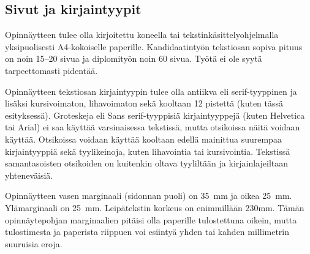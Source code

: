 \documentclass[english,12pt,a4paper,pdftex,elec,utf8]{aaltothesis}
\begin{document}
\subsection*{Sivut ja kirjaintyypit}

Opinn\"aytteen tulee olla kirjoitettu koneella tai
tekstink\"asittelyohjelmalla yksipuolisesti A4-kokoiselle paperille.
Kandidaatinty\"on tekstiosan sopiva pituus on noin 15--20 sivua ja
diplomity\"on noin 60 sivua. Ty\"ot\"a ei ole syyt\"a tarpeettomasti pident\"a\"a.

Opinn\"aytteen tekstiosan kirjaintyypin tulee olla antiikva eli
serif\--tyyp\-pi\-nen ja lis\"aksi kursivoimaton, lihavoimaton sek\"a kooltaan 12
pistett\"a (kuten t\"ass\"a esityksess\"a). Groteskeja eli \textsf{Sans
  serif}-tyyppisi\"a kirjaintyyppej\"a (kuten Helvetica tai Arial) ei saa
k\"aytt\"a\"a varsinaisessa tekstiss\"a, mutta otsikoissa n\"ait\"a voidaan
k\"aytt\"a\"a.  Otsikoissa voidaan k\"aytt\"a\"a kooltaan edell\"a mainittua
suurempaa kirjaintyyppi\"a sek\"a tyylikeinoja, kuten lihavointia tai
kursivointia.  Tekstiss\"a samantasoisten otsikoiden on kuitenkin oltava
tyylilt\"a\"an ja kirjainlajeiltaan yhtenev\"aisi\"a.
\begin{table}[htb]
\caption{Taulukoissa ja kuvissa kirjaintyypin voi valita
tarkoituksenmukaisesti, mutta kuva- ja taulukkoteksteiss\"a tulee
k\"aytt\"a\"a samaa kirjaintyyppi\"a kuin varsinaisessa tekstiss\"a.
Huomaa taulukon numeroinnin sijoittuminen taulukon yl\"apuolelle. \label{taulukko1}}
\begin{center}
\end{center}
\end{table}

Opinn\"aytteen vasen marginaali (sidonnan puoli) on
35~mm %
ja oikea 25~mm. Yl\"amarginaali on 25~mm. Leip\"atekstin korkeus on
enimmill\"a\"an 230mm. T\"am\"an opinn\"aytepohjan marginaalien pit\"aisi olla
paperille tulostettuna oikein, mutta tulostimesta ja paperista
riippuen voi esiinty\"a yhden tai kahden millimetrin suuruisia eroja.
\end{document}
